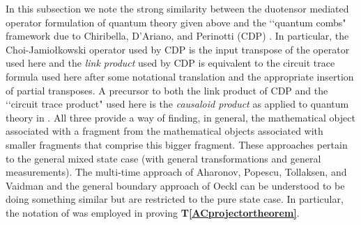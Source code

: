 \documentclass[10pt]{article}
\begin{document}
In this subsection we note the strong similarity between the duotensor mediated operator formulation of quantum theory given above and the \lq\lq quantum combs" framework due to Chiribella, D'Ariano, and Perinotti (CDP) \cite{chiribella2009theoretical}.  In particular, the Choi-Jamio\l kowski operator used by CDP is the input transpose of the operator used here and the \emph{link product} used by CDP is equivalent to the circuit trace formula used here after some notational translation and the appropriate insertion of partial transposes.  A precursor to both the link product of CDP and the \lq\lq circuit trace product" used here is the \emph{causaloid product} as applied to quantum theory in \cite{hardy2005probability, hardy2007towards}.  All three provide a way of finding, in general, the mathematical object associated with a fragment from the mathematical objects associated with smaller fragments that comprise this bigger fragment.  These approaches pertain to the general mixed state case (with general transformations and general measurements).  The multi-time approach of Aharonov, Popescu, Tollaksen, and Vaidman \cite{aharonov2009multiple} and the general boundary approach of Oeckl \cite{oeckl2003general} can be understood to be doing something similar but are restricted to the pure state case.  In particular, the notation of \cite{aharonov2009multiple} was employed in proving {\bf T\ref{ACprojectortheorem}}.
\end{document}
